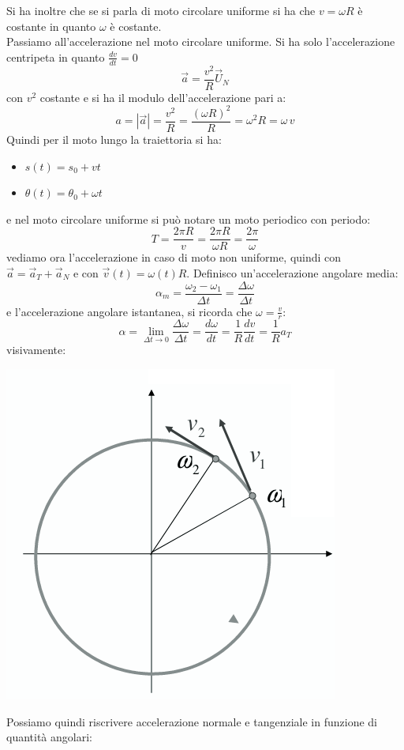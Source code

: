 \documentclass[a4paper,12pt, oneside]{book}
\begin{document}
Si ha inoltre che se si parla di moto circolare uniforme si ha che $v=\omega R$ è costante in quanto $\omega$ è costante.\\
Passiamo all'accelerazione nel moto circolare uniforme. Si ha solo l'accelerazione centripeta in quanto $\frac{dv}{dt}=0$
$$\vec{a}=\frac{v^2}{R}\vec{U}_N$$
con $v^2$ costante e si ha il modulo dell'accelerazione pari a:
$$a=|\vec{a}|=\frac{v^2}{R}=\frac{(\omega R)^2}{R}=\omega^2 R=\omega \, v$$
Quindi per il moto lungo la traiettoria si ha:
\begin{itemize}
\item $s(t)=s_0+vt$
\item $\theta(t)=\theta_0+\omega t$
\end{itemize}
e nel moto circolare uniforme si può notare un moto periodico con periodo:
$$T=\frac{2\pi R}{v}=\frac{2\pi R}{\omega R}=\frac{2\pi}{\omega}$$
vediamo ora l'accelerazione in caso di moto non uniforme, quindi con $\vec{a}=\vec{a}_T+\vec{a}_N$ e con $\vec{v}(t)=\omega(t)R$. Definisco un'accelerazione angolare media:
$$\alpha_m=\frac{\omega_2-\omega_1}{\Delta t}=\frac{\Delta\omega}{\Delta t}$$
e l'accelerazione angolare istantanea, si ricorda che $\omega=\frac{v}{r}$:
$$\alpha=\lim_{\Delta t\to 0}\frac{\Delta\omega}{\Delta t}=\frac{d\omega}{dt}=\frac{1}{R}\frac{dv}{dt}=\frac{1}{R}a_T$$
\newpage
visivamente:
\begin{center}
\includegraphics[scale=0.4]{img/cir4.png}
\end{center}
Possiamo quindi riscrivere accelerazione normale e tangenziale in funzione di quantità angolari:
\end{document}
